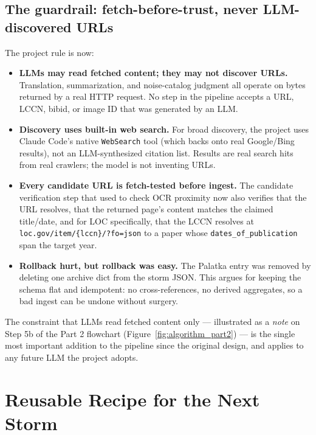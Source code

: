 \documentclass[11pt,letterpaper]{article}
\begin{document}
\subsection{The guardrail: fetch-before-trust, never LLM-discovered URLs}

The project rule is now:

\begin{itemize}[leftmargin=1.5em]
  \item \textbf{LLMs may read fetched content; they may not discover URLs.} Translation, summarization, and noise-catalog judgment all operate on bytes returned by a real HTTP request. No step in the pipeline accepts a URL, LCCN, bibid, or image ID that was generated by an LLM.
  \item \textbf{Discovery uses built-in web search.} For broad discovery, the project uses Claude Code's native \texttt{WebSearch} tool (which backs onto real Google/Bing results), not an LLM-synthesized citation list. Results are real search hits from real crawlers; the model is not inventing URLs.
  \item \textbf{Every candidate URL is fetch-tested before ingest.} The candidate verification step that used to check OCR proximity now also verifies that the URL resolves, that the returned page's content matches the claimed title/date, and for LOC specifically, that the LCCN resolves at \texttt{loc.gov/item/\{lccn\}/?fo=json} to a paper whose \texttt{dates\_of\_publication} span the target year.
  \item \textbf{Rollback hurt, but rollback was easy.} The Palatka entry was removed by deleting one archive dict from the storm JSON. This argues for keeping the schema flat and idempotent: no cross-references, no derived aggregates, so a bad ingest can be undone without surgery.
\end{itemize}

The constraint that LLMs read fetched content only --- illustrated as a \emph{note} on Step 5b of the Part 2 flowchart (Figure~\ref{fig:algorithm_part2}) --- is the single most important addition to the pipeline since the original design, and applies to any future LLM the project adopts.

\section{Reusable Recipe for the Next Storm}
\end{document}

